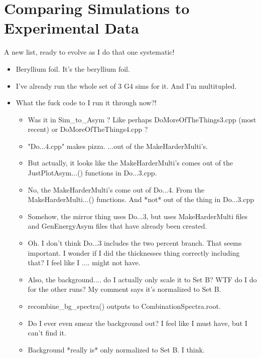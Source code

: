 \section{Comparing Simulations to Experimental Data}
\label{sec:comparing_data_sims}
A new list, ready to evolve as I do that one systematic!  
\begin{itemize}
	\item Beryllium foil.  It's the beryllium foil.  
	\item I've already run the whole set of 3 G4 sims for it.  And I'm multitupled.  
	\item What the fuck code to I run it through now?!
	\begin{itemize}
		\item Was it in Sim\_to\_Asym ?  Like perhaps DoMoreOfTheThings3.cpp (most recent) or DoMoreOfTheThings4.cpp ?
		\item "Do...4.cpp" makes pizza.  ...out of the MakeHarderMulti's.
		\item But actually, it looks like the MakeHarderMulti's comes out of the JustPlotAsym...() functions in Do...3.cpp.
		\item No, the MakeHarderMulti's come out of Do...4.  From the MakeHarderMulti...() functions.  And *not* out of the thing in Do...3.cpp
		\item Somehow, the mirror thing uses Do...3, but uses MakeHarderMulti files and GenEnergyAsym files that have already been created.
		\item Oh.  I don't think Do...3 includes the two percent branch.  That seems important.  I wonder if I did the thicknesses thing correctly including that?  I feel like I .... might not have.
		\item Also, the background.... do I actually only scale it to Set B?  WTF do I do for the other runs? My comment says it's normalized to Set B.
		\item recombine\_bg\_spectra() outputs to CombinationSpectra.root.
		\item Do I ever even smear the background out?  I feel like I must have, but I can't find it.
		\item Background *really is* only normalized to Set B.  I think.
	\end{itemize}
\end{itemize}


